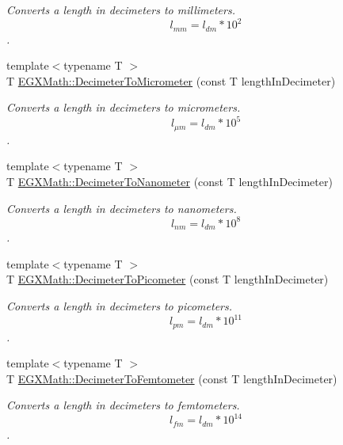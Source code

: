 \begin{DoxyCompactItemize}
\begin{DoxyCompactList}\small\item\em Converts a length in decimeters to millimeters. \[ l_{mm}=l_{dm} * 10^{2} \]. \end{DoxyCompactList}\item 
{\footnotesize template$<$typename T $>$ }\\T \mbox{\hyperlink{group___e_g_x_math-_conversions-_length_conversions-_decimeter-_s_i_ga5cf28083fa005b5a6a0dd6817c1633b7}{E\+G\+X\+Math\+::\+Decimeter\+To\+Micrometer}} (const T length\+In\+Decimeter)
\begin{DoxyCompactList}\small\item\em Converts a length in decimeters to micrometers. \[ l_{\mu m}=l_{dm} * 10^{5} \]. \end{DoxyCompactList}\item 
{\footnotesize template$<$typename T $>$ }\\T \mbox{\hyperlink{group___e_g_x_math-_conversions-_length_conversions-_decimeter-_s_i_ga5bf2905937fea582ee35031d9017807f}{E\+G\+X\+Math\+::\+Decimeter\+To\+Nanometer}} (const T length\+In\+Decimeter)
\begin{DoxyCompactList}\small\item\em Converts a length in decimeters to nanometers. \[ l_{nm}=l_{dm} * 10^{8} \]. \end{DoxyCompactList}\item 
{\footnotesize template$<$typename T $>$ }\\T \mbox{\hyperlink{group___e_g_x_math-_conversions-_length_conversions-_decimeter-_s_i_gaac5fa4b7b538abe2d19f33e131e9bbde}{E\+G\+X\+Math\+::\+Decimeter\+To\+Picometer}} (const T length\+In\+Decimeter)
\begin{DoxyCompactList}\small\item\em Converts a length in decimeters to picometers. \[ l_{pm}=l_{dm} * 10^{11} \]. \end{DoxyCompactList}\item 
{\footnotesize template$<$typename T $>$ }\\T \mbox{\hyperlink{group___e_g_x_math-_conversions-_length_conversions-_decimeter-_s_i_gab06170fbc8b349582e4ae34d41f3f706}{E\+G\+X\+Math\+::\+Decimeter\+To\+Femtometer}} (const T length\+In\+Decimeter)
\begin{DoxyCompactList}\small\item\em Converts a length in decimeters to femtometers. \[ l_{fm}=l_{dm} * 10^{14} \]. \end{DoxyCompactList}\item 

\end{DoxyCompactItemize}
